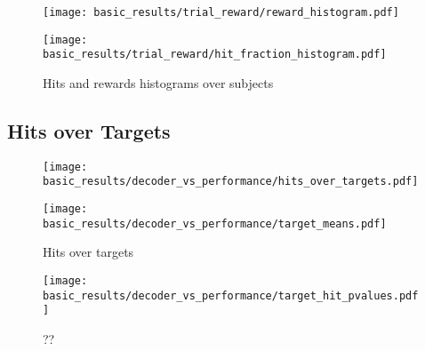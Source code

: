 \documentclass[../main.tex]{subfiles}
\begin{document}
\begin{figure}
    \centering
    \begin{minipage}{0.49\textwidth}
        \texttt{[image: basic\_results/trial\_reward/reward\_histogram.pdf]}
        \subcaption{}
    \end{minipage}
    \begin{minipage}{0.49\textwidth}
        \texttt{[image: basic\_results/trial\_reward/hit\_fraction\_histogram.pdf]}
      \subcaption{}
    \end{minipage}
    \caption[Hit and reward histograms]{Hits and rewards histograms over subjects}\label{fig:reward_histograms}
\end{figure}



\subsection{Hits over Targets}

\begin{figure}[tph]
    \centering
    \begin{minipage}{0.49\textwidth}
        \texttt{[image: basic\_results/decoder\_vs\_performance/hits\_over\_targets.pdf]}
        \subcaption{}
    \end{minipage}
    \begin{minipage}{0.49\textwidth}
        \texttt{[image: basic\_results/decoder\_vs\_performance/target\_means.pdf]}
      \subcaption{}
    \end{minipage}
    \caption[Hits over targets]{Hits over targets}\label{fig:hits_over_targets}
\end{figure}


\begin{figure}[tph]
    \centering
    \texttt{[image: basic\_results/decoder\_vs\_performance/target\_hit\_pvalues.pdf]}
    \caption[Target hit Tukey test]{??}\label{fig:target_hit_pvalues}
\end{figure}

\end{document}
